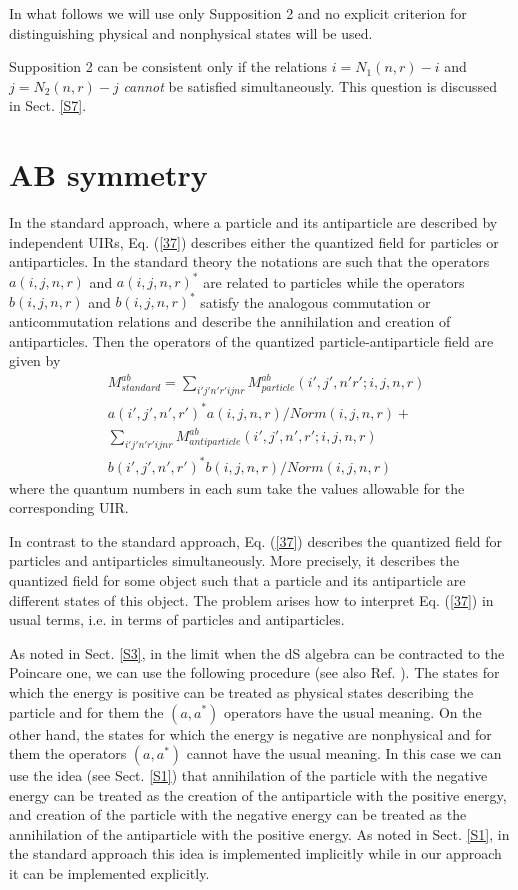 \documentclass[a4paper,12pt]{article}%
\begin{document}
In what follows we will use only Supposition 2 and
no explicit criterion for distinguishing physical
and nonphysical states will be used.

\begin{sloppypar}
Supposition 2 can be consistent only if the
relations $i=N_1(n,r)-i$ and $j=N_2(n,r)-j$ 
{\it cannot} be satisfied simultaneously. This
question is discussed in Sect. \ref{S7}.
\end{sloppypar}

\section{AB symmetry}
\label{S6}

In the standard approach, where a particle and its 
antiparticle are described by independent UIRs, Eq. 
(\ref{37}) describes either the quantized field for
particles or antiparticles. In the standard theory
the notations are such that the operators 
$a(i,j,n,r)$ and $a(i,j,n,r)^*$ are related
to particles while the operators $b(i,j,n,r)$ and
$b(i,j,n,r)^*$ satisfy the analogous commutation or
anticommutation relations
and describe the annihilation and creation of antiparticles.
Then the operators of the quantized
particle-antiparticle field are given by
\begin{eqnarray}  
&M_{standard}^{ab}=\sum_{i'j'n'r'ijnr} M_{particle}^{ab}
(i',j',n'r';i,j,n,r)\nonumber\\
&a(i',j',n',r')^*a(i,j,n,r)/Norm(i,j,n,r)+\nonumber\\
&\sum_{i'j'n'r'ijnr} 
M_{antiparticle}^{ab}(i',j',n',r';i,j,n,r)\nonumber\\
&b(i',j',n',r')^*b(i,j,n,r)/Norm(i,j,n,r)
\label{48}
\end{eqnarray}
where the quantum numbers in each sum take the
values allowable for the corresponding UIR. 

In contrast to the standard approach, Eq. (\ref{37}) 
describes the quantized field for particles and 
antiparticles simultaneously. More precisely, it
describes the quantized field for some object such
that a particle and its antiparticle are different
states of this object. The problem arises how to
interpret Eq. (\ref{37}) in usual terms, i.e. in
terms of particles and antiparticles. 

As noted in Sect. \ref{S3}, in the limit when the
dS algebra can be contracted to the Poincare one, we
can use the following procedure (see also Ref. 
\cite{hep}). The states for which the energy
is positive can be treated as physical 
states describing the particle and for them the 
$(a,a^*)$ operators have the usual meaning. 
On the other hand, the states for which the energy
is negative are nonphysical and for
them the operators $(a,a^*)$ cannot have the usual
meaning. In this case we can use the idea (see
Sect. \ref{S1}) that annihilation of the
particle with the negative energy can be treated
as the creation of the antiparticle with the
positive energy, and creation of the
particle with the negative energy can be treated
as the annihilation of the antiparticle with the
positive energy. As noted in Sect. \ref{S1}, in the
standard approach this idea is implemented
implicitly while in our approach it can be
implemented explicitly. 
\end{document}
